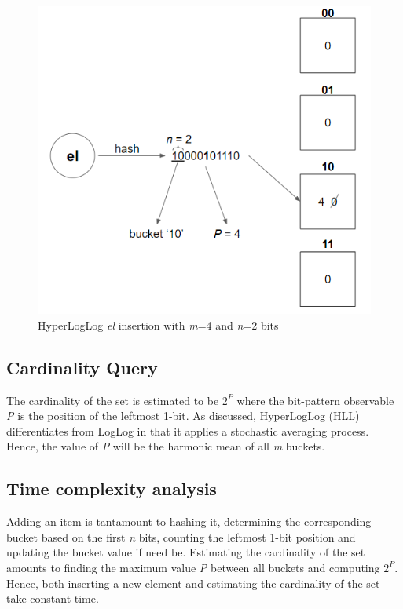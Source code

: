\begin{figure}[!htb]
    \begin{center}
      \includegraphics[scale=1]{figures/hll-insertion.png}
      \caption[HyperLogLog insertion]{HyperLogLog \textit{el} insertion with \textit{m}=4 and \textit{n}=2 bits}
      \label{fig:hll-insert}
    \end{center}
\end{figure}

\subsection*{Cardinality Query}
The cardinality of the set is estimated to be $2^\textit{P}$ where the bit-pattern observable \textit{P} is the position of the leftmost 1-bit. As discussed, HyperLogLog (HLL) differentiates from LogLog in that it applies a stochastic averaging process. Hence, the value of \textit{P} will be the harmonic mean of all \textit{m} buckets.


\subsection*{Time complexity analysis}
Adding an item is tantamount to hashing it, determining the corresponding bucket based on the first \textit{n} bits, counting the leftmost 1-bit position and updating the bucket value if need be. Estimating the cardinality of the set amounts to finding the maximum value \textit{P} between all buckets and computing $2^P$. Hence, both inserting a new element and estimating the cardinality of the set take constant time.


